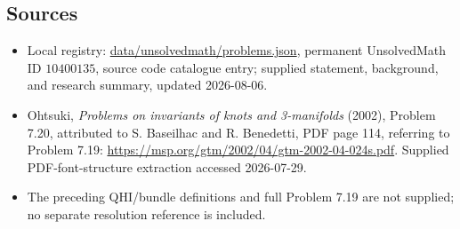 \documentclass[11pt]{article}
\begin{document}
\subsection{Sources}
\begin{itemize}
\item Local registry: \url{data/unsolvedmath/problems.json}, permanent UnsolvedMath ID \(10400135\), source code catalogue entry; supplied statement, background, and research summary, updated 2026-08-06.
\item Ohtsuki, \emph{Problems on invariants of knots and 3-manifolds} (2002), Problem 7.20, attributed to S. Baseilhac and R. Benedetti, PDF page 114, referring to Problem 7.19: \url{https://msp.org/gtm/2002/04/gtm-2002-04-024s.pdf}. Supplied PDF-font-structure extraction accessed 2026-07-29.
\item The preceding QHI/bundle definitions and full Problem 7.19 are not supplied; no separate resolution reference is included.
\end{itemize}
\end{document}
